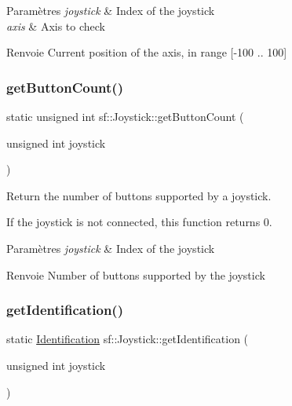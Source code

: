 \begin{DoxyParams}{Paramètres}
{\em joystick} & Index of the joystick \\
\hline
{\em axis} & Axis to check\\
\hline
\end{DoxyParams}
\begin{DoxyReturn}{Renvoie}
Current position of the axis, in range \mbox{[}-\/100 .. 100\mbox{]} 
\end{DoxyReturn}
\mbox{\label{classsf_1_1Joystick_a4de9f445c6582bfe9f0873f695682885}} 
\subsubsection{\texorpdfstring{get\+Button\+Count()}{getButtonCount()}}
{\footnotesize\ttfamily static unsigned int sf\+::\+Joystick\+::get\+Button\+Count (\begin{DoxyParamCaption}\item[{unsigned int}]{joystick }\end{DoxyParamCaption})\hspace{0.3cm}{\ttfamily [static]}}



Return the number of buttons supported by a joystick. 

If the joystick is not connected, this function returns 0.


\begin{DoxyParams}{Paramètres}
{\em joystick} & Index of the joystick\\
\hline
\end{DoxyParams}
\begin{DoxyReturn}{Renvoie}
Number of buttons supported by the joystick 
\end{DoxyReturn}
\mbox{\label{classsf_1_1Joystick_aa917c9435330e6e0368d3893672d1b74}} 
\subsubsection{\texorpdfstring{get\+Identification()}{getIdentification()}}
{\footnotesize\ttfamily static \hyperlink{structsf_1_1Joystick_1_1Identification}{Identification} sf\+::\+Joystick\+::get\+Identification (\begin{DoxyParamCaption}\item[{unsigned int}]{joystick }\end{DoxyParamCaption})\hspace{0.3cm}{\ttfamily [static]}}



